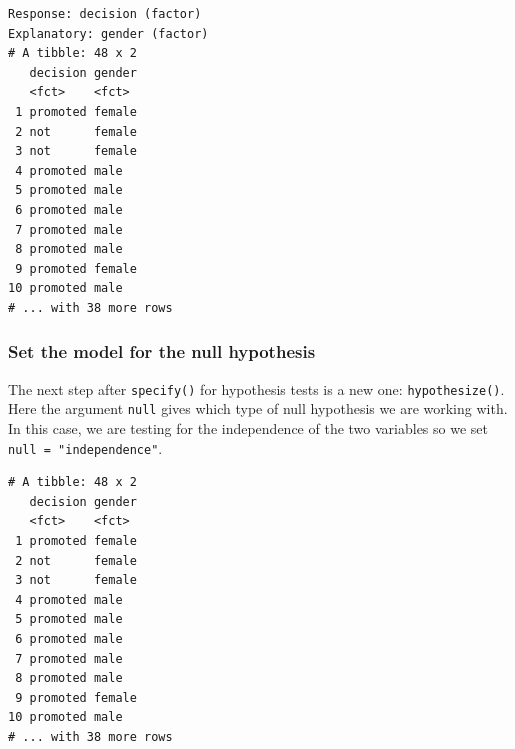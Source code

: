 \documentclass[12pt, krantz2,]{krantz}
\makeatletter
\newenvironment{Shaded}{\begin{snugshade}}{\end{snugshade}}
\newcommand{\DataTypeTok}[1]{\textcolor[rgb]{0.27,0.27,0.27}{#1}}
\newcommand{\KeywordTok}[1]{\textcolor[rgb]{0.27,0.27,0.27}{\textbf{#1}}}
\newcommand{\NormalTok}[1]{#1}
\newcommand{\OperatorTok}[1]{\textcolor[rgb]{0.43,0.43,0.43}{\textbf{#1}}}
\newcommand{\StringTok}[1]{\textcolor[rgb]{0.5,0.5,0.5}{#1}}
\newenvironment{kframe}{%
\medskip{}
\setlength{\fboxsep}{.8em}
 \def\at@end@of@kframe{}%
 \ifinner\ifhmode%
  \def\at@end@of@kframe{\end{minipage}}%
  \begin{minipage}{\columnwidth}%
 \fi\fi%
 \def\FrameCommand##1{\hskip\@totalleftmargin \hskip-\fboxsep
 \colorbox{shadecolor}{##1}\hskip-\fboxsep
     \hskip-\linewidth \hskip-\@totalleftmargin \hskip\columnwidth}%
 \MakeFramed {\advance\hsize-\width
   \@totalleftmargin\z@ \linewidth\hsize
   \@setminipage}}%
 {\par\unskip\endMakeFramed%
 \at@end@of@kframe}
\renewenvironment{Shaded}{\begin{kframe}}{\end{kframe}}
\makeatother
\begin{document}
\begin{Shaded}
\end{Shaded}

\begin{verbatim}
Response: decision (factor)
Explanatory: gender (factor)
# A tibble: 48 x 2
   decision gender
   <fct>    <fct> 
 1 promoted female
 2 not      female
 3 not      female
 4 promoted male  
 5 promoted male  
 6 promoted male  
 7 promoted male  
 8 promoted male  
 9 promoted female
10 promoted male  
# ... with 38 more rows
\end{verbatim}

\hypertarget{set-the-model-for-the-null-hypothesis}{%
\subsubsection*{Set the model for the null hypothesis}\label{set-the-model-for-the-null-hypothesis}}


The next step after \texttt{specify()} for hypothesis tests is a new one: \texttt{hypothesize()}. Here the argument \texttt{null} gives which type of null hypothesis we are working with. In this case, we are testing for the independence of the two variables so we set \texttt{null\ =\ "independence"}.

\begin{Shaded}
\end{Shaded}

\begin{verbatim}
# A tibble: 48 x 2
   decision gender
   <fct>    <fct> 
 1 promoted female
 2 not      female
 3 not      female
 4 promoted male  
 5 promoted male  
 6 promoted male  
 7 promoted male  
 8 promoted male  
 9 promoted female
10 promoted male  
# ... with 38 more rows
\end{verbatim}
\end{document}
